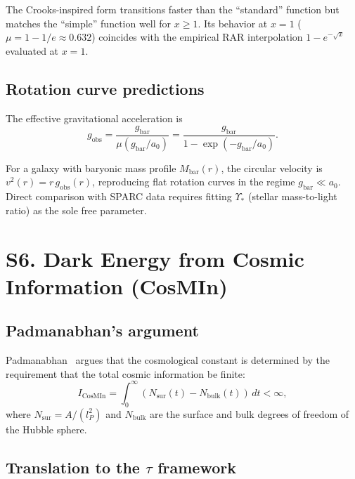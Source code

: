 \documentclass[aps,prd,preprint,superscriptaddress,longbibliography]{revtex4-2}
\newcommand{\tauasym}{\tau}
\newcommand{\azero}{a_0}
\begin{document}
The Crooks-inspired form transitions faster than the ``standard''
function but matches the ``simple'' function well for $x \ge 1$.
Its behavior at $x = 1$ ($\mu = 1-1/e \approx 0.632$) coincides
with the empirical RAR interpolation $1-e^{-\sqrt{x}}$ evaluated at
$x=1$.

\subsection{Rotation curve predictions}

The effective gravitational acceleration is
\begin{equation}
g_{\mathrm{obs}} = \frac{g_{\mathrm{bar}}}{\mu(g_{\mathrm{bar}}/\azero)}
= \frac{g_{\mathrm{bar}}}{1-\exp(-g_{\mathrm{bar}}/\azero)}.
\label{eq:gobs}
\end{equation}

For a galaxy with baryonic mass profile $M_{\mathrm{bar}}(r)$, the
circular velocity is
$v^2(r) = r\,g_{\mathrm{obs}}(r)$, reproducing flat rotation curves
in the regime $g_{\mathrm{bar}} \ll \azero$.  Direct comparison with
SPARC data requires fitting $\Upsilon_*$ (stellar mass-to-light
ratio) as the sole free parameter.

\section{S6. Dark Energy from Cosmic Information (CosMIn)}
\label{sec:dark_energy}

\subsection{Padmanabhan's argument}

Padmanabhan~\cite{Padmanabhan2017} argues that the cosmological
constant is determined by the requirement that the total cosmic
information be finite:
\begin{equation}
I_{\mathrm{CosMIn}} = \int_0^{\infty}
(N_{\mathrm{sur}}(t) - N_{\mathrm{bulk}}(t))\,dt < \infty,
\label{eq:cosmin}
\end{equation}
where $N_{\mathrm{sur}} = A/(l_P^2)$ and $N_{\mathrm{bulk}}$ are
the surface and bulk degrees of freedom of the Hubble sphere.

\subsection{Translation to the $\tauasym$ framework}
\end{document}
